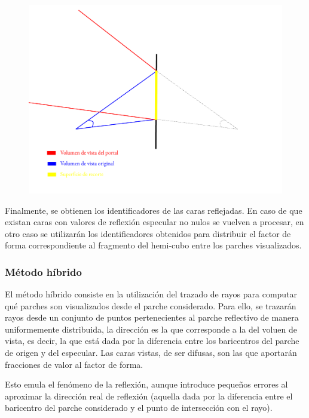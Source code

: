 \begin{figure}[H]
	\centering
	\includegraphics[width=.8\linewidth]{assets/Espejo}
	\label{img:espejo}
\end{figure}

Finalmente, se obtienen los identificadores de las caras reflejadas. En caso de que existan caras con valores de reflexión especular no nulos se vuelven a procesar, en otro caso se utilizarán los identificadores obtenidos para distribuir el factor de forma correspondiente al fragmento del hemi-cubo entre los parches visualizados.

\subsubsection{Método híbrido}

El método híbrido consiste en la utilización del trazado de rayos para computar qué parches son visualizados desde el parche considerado. Para ello, se trazarán rayos desde un conjunto de puntos pertenecientes al parche reflectivo de manera uniformemente distribuida, la dirección es la que corresponde a la del voluen de vista, es decir, la que está dada por la diferencia entre los baricentros del parche de origen y del especular. Las caras vistas, de ser difusas, son las que aportarán fracciones de valor al factor de forma.

Esto emula el fenómeno de la reflexión, aunque introduce pequeños errores al aproximar la dirección real de reflexión (aquella dada por la diferencia entre el baricentro del parche considerado y el punto de intersección con el rayo).

